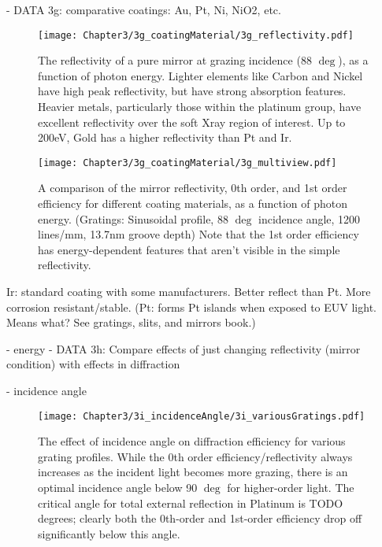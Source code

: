            - DATA 3g: comparative coatings: Au, Pt, Ni, NiO2, etc.
           
\begin{figure}[htbp] %
   \centering
   \texttt{[image: Chapter3/3g\_coatingMaterial/3g\_reflectivity.pdf]} 
   \caption{The reflectivity of a pure mirror at grazing incidence (88 $\deg$), as a function of photon energy.  Lighter elements like Carbon and Nickel have high peak reflectivity, but have strong absorption features.  Heavier metals, particularly those within the platinum group, have excellent reflectivity over the soft Xray region of interest.  Up to 200eV, Gold has a higher reflectivity than Pt and Ir. }
   \label{3g}
\end{figure}

\begin{figure}[htbp] %
   \centering
   \texttt{[image: Chapter3/3g\_coatingMaterial/3g\_multiview.pdf]} 
   \caption{A comparison of the mirror reflectivity, 0th order, and 1st order efficiency for different coating materials, as a function of photon energy.  (Gratings: Sinusoidal profile, 88 $\deg$ incidence angle, 1200 lines/mm, 13.7nm groove depth)  Note that the 1st order efficiency has energy-dependent features that aren't visible in the simple reflectivity.}
   \label{3g-2}
\end{figure}
           
           Ir: standard coating with some manufacturers. Better reflect than Pt.  More corrosion resistant/stable.   (Pt: forms Pt islands when exposed to EUV light.  Means what? See gratings, slits, and mirrors book.)
           
     - energy
          - DATA 3h: Compare effects of just changing reflectivity (mirror condition) with effects in diffraction
          
          
     - incidence angle

\begin{figure}[htbp] %
   \centering
   \texttt{[image: Chapter3/3i\_incidenceAngle/3i\_variousGratings.pdf]} 
   \caption{The effect of incidence angle on diffraction efficiency for various grating profiles.  While the 0th order efficiency/reflectivity always increases as the incident light becomes more grazing, there is an optimal incidence angle below 90 $\deg$ for higher-order light.  The critical angle for total external reflection in Platinum is TODO degrees; clearly both the 0th-order and 1st-order efficiency drop off significantly below this angle. }
   \label{3i}
\end{figure}

